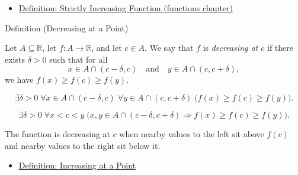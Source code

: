\begin{dependencies}
\begin{itemize}
  \item \hyperref[def:function-strictly-increasing]{Definition: Strictly Increasing Function (functions chapter)}
\end{itemize}
\end{dependencies}


\begin{definitionbox}{Definition (Decreasing at a Point)}
\begin{definition}
\label{def:decreasing-at-a-point}
Let $A \subseteq \mathbb{R}$, let $f : A \to \mathbb{R}$, and let $c \in A$. We say that $f$ is \emph{decreasing at $c$} if there exists $\delta > 0$ such that for all
\[
x \in A \cap (c-\delta,c)
\quad \text{and} \quad
y \in A \cap (c,c+\delta),
\]
we have $f(x) \geq f(c) \geq f(y)$.
\end{definition}
\end{definitionbox}

\begin{remark*}
\[
\exists \delta > 0\;\forall x \in A \cap (c-\delta,c)\;\forall y \in A \cap (c,c+\delta)
\;\bigl(f(x) \geq f(c) \geq f(y)\bigr).
\]
\end{remark*}

\begin{remark*}
\[
\exists \delta>0\;\forall x<c<y\;
\bigl(x,y\in A\cap(c-\delta,c+\delta)\Rightarrow f(x)\ge f(c)\ge f(y)\bigr).
\]
\end{remark*}

\begin{remark*}[Interpretation]
The function is decreasing at $c$ when nearby values to the left sit above $f(c)$ and nearby values to the right sit below it.
\end{remark*}

\begin{dependencies}
\begin{itemize}
  \item \hyperref[def:increasing-at-a-point]{Definition: Increasing at a Point}
\end{itemize}
\end{dependencies}

